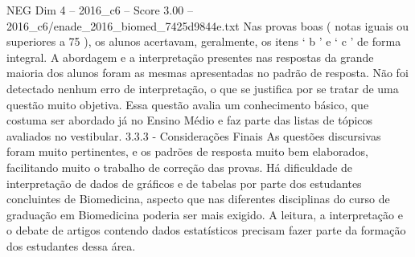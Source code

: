 \begin{textsample}{NEG Dim 4 – 2016\_c6 – Score 3.00 – 2016\_c6/enade\_2016\_biomed\_7425d9844e.txt}
Nas provas boas ( notas iguais ou superiores a 75 ), os alunos acertavam, geralmente, os itens ‘ b ’ e ‘ c ’ de forma integral.
A abordagem e a interpretação presentes nas respostas da grande maioria dos alunos foram as mesmas apresentadas no padrão de resposta.
Não foi detectado nenhum erro de interpretação, o que se justifica por se tratar de uma questão muito objetiva.
Essa questão avalia um conhecimento básico, que costuma ser abordado já no Ensino Médio e faz parte das listas de tópicos avaliados no vestibular. 3.3.3 - Considerações Finais As questões discursivas foram muito pertinentes, e os padrões de resposta muito bem elaborados, facilitando muito o trabalho de correção das provas.
Há dificuldade de interpretação de dados de gráficos e de tabelas por parte dos estudantes concluintes de Biomedicina, aspecto que nas diferentes disciplinas do curso de graduação em Biomedicina poderia ser mais exigido.
A leitura, a interpretação e o debate de artigos contendo dados estatísticos precisam fazer parte da formação dos estudantes dessa área.

\end{textsample}
